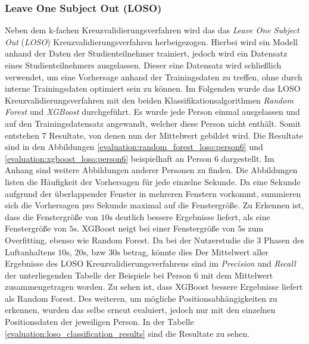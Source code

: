 \subsubsection{Leave One Subject Out (LOSO)}
Neben dem k-fachen Kreuzvalidierungsverfahren wird das das \textit{Leave One Subject Out} (\textit{LOSO}) Kreuzvalidierungsverfahren herbeigezogen. 
Hierbei wird ein Modell anhand der Daten der Studienteilnehmer trainiert, jedoch wird ein Datensatz eines Studienteilnehmers ausgelassen. 
Dieser eine Datensatz wird schließlich verwendet, um eine Vorhersage anhand der Trainingsdaten zu treffen, ohne durch interne Trainingsdaten optimiert sein zu können.
Im Folgenden wurde das LOSO Kreuzvalidierungsverfahren mit den beiden Klassifikationsalgorithmen \textit{Random Forest} und \textit{XGBoost} durchgeführt. 
Es wurde jede Person einmal ausgelassen und auf den Trainingsdatensatz angewandt, welcher diese Person nicht enthält. 
Somit entstehen 7 Resultate, von denen nun der Mittelwert gebildet wird.
Die Resultate sind in den Abbildungen \ref{evaluation:random_forest_loso:person6} und \ref{evaluation:xgboost_loso:person6} beispielhaft an Person 6 dargestellt.
Im Anhang sind weitere Abbildungen anderer Personen zu finden.
Die Abbildungen listen die Häufigkeit der Vorhersagen für jede einzelne Sekunde. 
Da eine Sekunde aufgrund der überlappender Fenster in mehreren Fenstern vorkommt, summieren sich die Vorhersagen pro Sekunde maximal auf die Fenstergröße.
Zu Erkennen ist, dass die Fenstergröße von $10\si{\s}$ deutlich bessere Ergebnisse liefert, als eine Fenstergröße von $5\si{\s}$. 
XGBoost neigt bei einer Fenstergröße von $5\si{\s}$ zum Overfitting, ebenso wie Random Forest. 
Da bei der Nutzerstudie die 3 Phasen des Luftanhaltens $10\si{\s}$, $20\si{\s}$, bzw $30\si{\s}$ betrag, könnte dies 
Der Mittelwert aller Ergebnisse des LOSO Kreuzvalidierungsverfahrens sind im \textit{Precision} und \textit{Recall} der unterliegenden Tabelle der Beispiele bei Person 6 mit dem Mittelwert zusammengetragen worden. 
Zu sehen ist, dass XGBoost bessere Ergebnisse liefert als Random Forest.
 \newline
Des weiteren, um mögliche Positionsabhängigkeiten zu erkennen, wurden das selbe erneut evaluiert, jedoch nur mit den einzelnen Positionsdaten der jeweiligen Person. 
In der Tabelle \ref{evaluation:loso_classification_results} sind die Resultate zu sehen.

